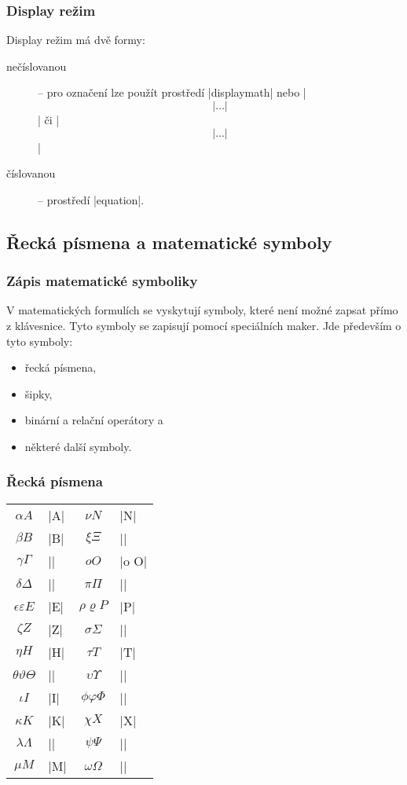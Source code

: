 \begin{frame}
	\frametitle{Display režim}
	\framebreak
	Display režim má dvě formy:
	\begin{description}
		\item [nečíslovanou] -- pro označení lze použít prostředí |displaymath| nebo |\[|\ldots|\]| či |$$|\ldots|$$|
		\item [číslovanou] -- prostředí |equation|.
	\end{description}
\end{frame}


\subsection{Řecká písmena a matematické symboly}
\begin{frame}
	\frametitle{Zápis matematické symboliky}
	V matematických formulích se vyskytují symboly, které není možné zapsat přímo z klávesnice. Tyto symboly se zapisují pomocí speciálních maker. Jde především o tyto symboly:
	\begin{itemize}
		\item řecká písmena,
		\item šipky,
		\item binární a relační operátory a
		\item některé další symboly.
	\end{itemize}
\end{frame}


\begin{frame}[fragile]
	\frametitle{Řecká písmena}
	\begin{center}
		\begin{tabular}{clcl}
			$\alpha A$ &|\alpha A| & $\nu N$ & |\nu N|\\
			$\beta B$ & |\beta B| & $\xi \Xi$ & |\xi \Xi|\\
			$\gamma \Gamma$ & |\gamma \Gamma| & $oO$ & |o O|\\
			$\delta \Delta$ & |\delta \Delta| & $\pi \Pi$ & |\pi \Pi|\\
			$\epsilon \varepsilon E$ & |\epsilon \varepsilon E| & $\rho \varrho P$ & |\rho\varrho P|\\
			$\zeta Z$ & |\zeta Z| & $\sigma \Sigma$ & |\sigma \Sigma|\\
			$\eta H$ & |\eta H| & $\tau T$ & |\tau T|\\
			$\theta \vartheta \Theta$ & |\theta \vartheta \Theta| & $\upsilon \Upsilon$ & |\upsilon \Upsilon|\\
			$\iota I$ & |\iota I| & $\phi \varphi \Phi$ & |\phi \varphi \Phi|\\
			$\kappa K$ & |\kappa K| & $\chi X$ & |\chi X|\\
			$\lambda \Lambda$ & |\lambda \Lambda| & $\psi \Psi$ & |\psi \Psi|\\
			$\mu M$ & |\mu M| & $\omega \Omega$ & |\omega \Omega|\\
		\end{tabular}
	\end{center}
\end{frame}


